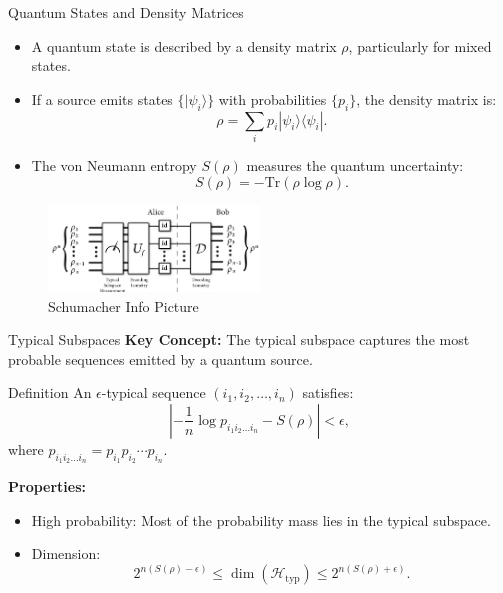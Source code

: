 \begin{frame}{Quantum States and Density Matrices}
    \begin{itemize}
        \item A quantum state is described by a density matrix \( \rho \), particularly for mixed states.
        \item If a source emits states \( \{ |\psi_i\rangle \} \) with probabilities \( \{ p_i \} \), the density matrix is:
        \[
        \rho = \sum_i p_i |\psi_i\rangle \langle \psi_i|.
        \]
        \item The von Neumann entropy \( S(\rho) \) measures the quantum uncertainty:
        \[
        S(\rho) = -\text{Tr}(\rho \log \rho).
        \]
    \end{itemize}
    \begin{figure}[h]
        \centering
        \includegraphics[width=0.5\textwidth]{figures/schumacher.png}
        \caption{Schumacher Info Picture \cite{PhysRevA.51.2738}}
    \end{figure}
\end{frame}

\begin{frame}{Typical Subspaces}
    \textbf{Key Concept:} The typical subspace captures the most probable sequences emitted by a quantum source.
    \begin{block}{Definition}
        An \(\epsilon\)-typical sequence \((i_1, i_2, \dots, i_n)\) satisfies:
        \[
        \left| -\frac{1}{n} \log p_{i_1 i_2 \dots i_n} - S(\rho) \right| < \epsilon,
        \]
        where \( p_{i_1 i_2 \dots i_n} = p_{i_1} p_{i_2} \cdots p_{i_n} \).
    \end{block}
    \textbf{Properties:}
    \begin{itemize}
        \item High probability: Most of the probability mass lies in the typical subspace.
        \item Dimension: 
        \[
        2^{n(S(\rho) - \epsilon)} \leq \dim(\mathcal{H}_{\text{typ}}) \leq 2^{n(S(\rho) + \epsilon)}.
        \]
    \end{itemize}
\end{frame}

